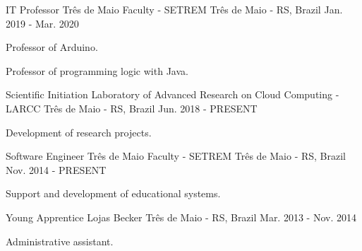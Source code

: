 
\begin{cventries}
  \cventry
  {IT Professor} %
  {Três de Maio Faculty - SETREM} %
  {Três de Maio - RS, Brazil} %
  {Jan. 2019 - Mar. 2020} %
  {
    \begin{cvitems} %
      \item {Professor of Arduino.}
      \item {Professor of programming logic with Java.}
    \end{cvitems}
  }

  \cventry
  {Scientific Initiation} %
  {Laboratory of Advanced Research on Cloud Computing - LARCC} %
  {Três de Maio - RS, Brazil} %
  {Jun. 2018 - PRESENT} %
  {
    \begin{cvitems} %
      \item {Development of research projects.}
    \end{cvitems}
  }

  \cventry
  {Software Engineer} %
  {Três de Maio Faculty - SETREM} %
  {Três de Maio - RS, Brazil} %
  {Nov. 2014 - PRESENT} %
  {
    \begin{cvitems} %
      \item {Support and development of educational systems.}
    \end{cvitems}
  }

  \cventry
  {Young Apprentice} %
  {Lojas Becker} %
  {Três de Maio - RS, Brazil} %
  {Mar. 2013 - Nov. 2014} %
  {
    \begin{cvitems} %
      \item {Administrative assistant.}
    \end{cvitems}
  }
\end{cventries}
